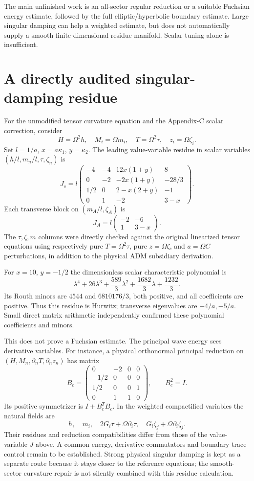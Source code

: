 \documentclass[11pt]{article}
\begin{document}
The main unfinished work is an all-sector regular reduction or a suitable Fuchsian energy estimate, followed by the full elliptic/hyperbolic boundary estimate. Large singular damping can help a weighted estimate, but does not automatically supply a smooth finite-dimensional residue manifold. Scalar tuning alone is insufficient.

\section{A directly audited singular-damping residue}
For the unmodified tensor curvature equation and the Appendix-C scalar
correction, consider
\[
H=\Omega^2h,\quad M_i=\Omega m_i,\quad
T=\Omega^2\tau,\quad z_i=\Omega\zeta_i.
\]
Set $l=1/a$, $x=a\kappa_1$, $y=\kappa_2$. The leading value-variable
residue in scalar variables $(h/l,m_n/l,\tau,\zeta_n)$ is
\[
J_s=l
\begin{pmatrix}
-4&-4&12x(1+y)&8\\
0&-2&-2x(1+y)&-28/3\\
1/2&0&2-x(2+y)&-1\\
0&1&-2&3-x
\end{pmatrix}.
\]
Each transverse block on $(m_A/l,\zeta_A)$ is
\[
J_A=l\begin{pmatrix}-2&-6\\1&3-x\end{pmatrix}.
\]
The $\tau,\zeta,m$ columns were directly checked against the original
linearized tensor equations using respectively pure $T=\Omega^2\tau$,
pure $z=\Omega\zeta$, and $a=\Omega C$ perturbations, in addition to the
physical ADM subsidiary derivation.

For $x=10$, $y=-1/2$ the dimensionless scalar characteristic polynomial is
\[
\lambda^4+26\lambda^3+\frac{589}{3}\lambda^2
+\frac{1682}{3}\lambda+\frac{1232}{3}.
\]
Its Routh minors are $4544$ and $6810176/3$, both positive, and all
coefficients are positive. Thus this residue is Hurwitz; transverse
eigenvalues are $-4/a,-5/a$. Small direct matrix arithmetic independently
confirmed these polynomial coefficients and minors.

This does not prove a Fuchsian estimate. The principal wave energy sees
derivative variables. For instance, a physical orthonormal principal
reduction on $(H,M_n,\partial_nT,\partial_nz_n)$ has matrix
\[
B_c=\begin{pmatrix}
0&-2&0&0\\
-1/2&0&0&0\\
1/2&0&0&1\\
0&1&1&0
\end{pmatrix},\qquad B_c^2=I .
\]
Its positive symmetrizer is $I+B_c^TB_c$. In the weighted compactified
variables the natural fields are
\[
h,\quad m_i,\quad 2G_i\tau+\Omega\partial_i\tau,\quad
G_i\zeta_j+\Omega\partial_i\zeta_j .
\]
Their residues and reduction compatibilities differ from those of the
value-variable $J$ above. A common energy, derivative commutators and
boundary trace control remain to be established. Strong physical
singular damping is kept as a separate route because it stays closer to
the reference equations; the smooth-sector curvature repair is not
silently combined with this residue calculation.
\end{document}
